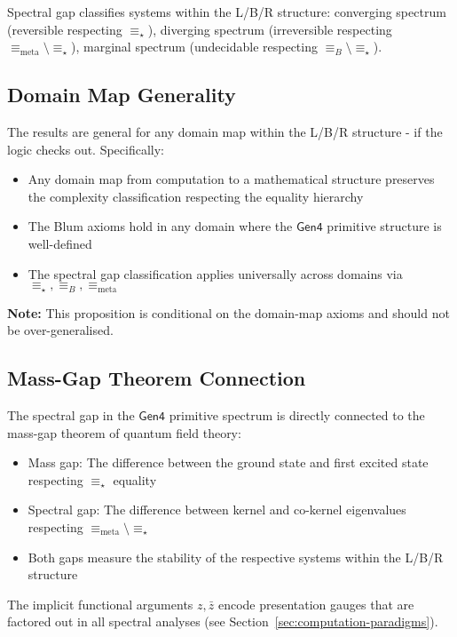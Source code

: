 \begin{theorem}
\label{thm:info-classification-lbr}
Spectral gap classifies systems within the L/B/R structure: converging spectrum (reversible respecting $\equiv_\star$), diverging spectrum (irreversible respecting $\equiv_{\text{meta}} \setminus \equiv_\star$), marginal spectrum (undecidable respecting $\equiv_B \setminus \equiv_\star$).
\end{theorem}

\subsection{Domain Map Generality}

\begin{proposition}
\label{prop:domain-generality-spectral-lbr}
The results are general for any domain map within the L/B/R structure - if the logic checks out. Specifically:
\begin{itemize}
\item Any domain map from computation to a mathematical structure preserves the complexity classification respecting the equality hierarchy
\item The Blum axioms hold in any domain where the $\mathsf{Gen4}$ primitive structure is well-defined
\item The spectral gap classification applies universally across domains via $\equiv_\star, \equiv_B, \equiv_{\text{meta}}$
\end{itemize}
\textbf{Note:} This proposition is conditional on the domain-map axioms and should not be over-generalised.
\end{proposition}

\subsection{Mass-Gap Theorem Connection}

\begin{remark}
\label{rem:mass-gap-spectral-gen4}
The spectral gap in the $\mathsf{Gen4}$ primitive spectrum is directly connected to the mass-gap theorem of quantum field theory:
\begin{itemize}
\item Mass gap: The difference between the ground state and first excited state respecting $\equiv_\star$ equality
\item Spectral gap: The difference between kernel and co-kernel eigenvalues respecting $\equiv_{\text{meta}} \setminus \equiv_\star$
\item Both gaps measure the stability of the respective systems within the L/B/R structure
\end{itemize}
The implicit functional arguments $z, \bar{z}$ encode presentation gauges that are factored out in all spectral analyses (see Section~\ref{sec:computation-paradigms}).
\end{remark}

